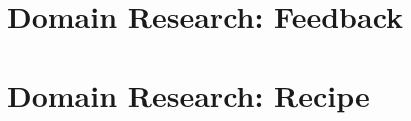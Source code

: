 \appendix

\chapter{Domain Research: Feedback} \label{app:feedback}

\chapter{Domain Research: Recipe} \label{app:recipe}

% 